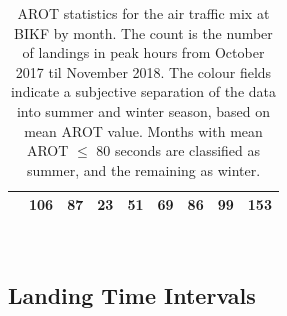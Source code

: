 \begin{table}[h]
{\begin{tabular}{lr|r|r|r|r|r|r|r|}
\rowcolor[HTML]{DAE8FC} 
\multicolumn{1}{|l|}{\cellcolor[HTML]{DAE8FC}December} & 106 & 87 & 23 & 51 & 69 & 86 & 99 & 153 \\ \hline
\end{tabular}%
}
\caption[AROTs for the air traffic mix by month]{AROT statistics for the air traffic mix at BIKF by month. The count is the number of landings in peak hours from October 2017 til November 2018. The colour fields indicate a subjective separation of the data into summer and winter season, based on mean AROT value. Months with mean AROT $\leq$ 80 seconds are classified as summer, and the remaining as winter.}
\label{my-label5}
\end{table}



\\



\subsection{Landing Time Intervals}


\begin{table}[h]
\centering
{}
\caption[RECAT-EU time-based separation minima]{RECAT-EU WT time-based separation minima on approach and departure~\cite{rooseleer2015recat}}
\label{tab:RECAT-time}
\end{table}


